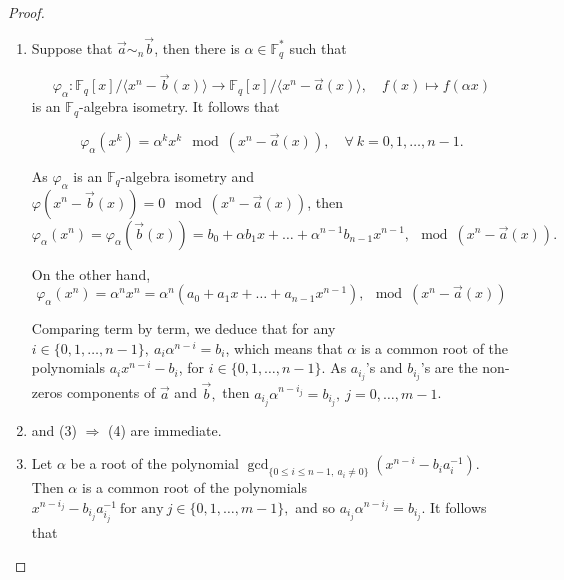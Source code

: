 \documentclass[12pt]{elsarticle}
\theoremstyle{break}
{\theorembodyfont{\upshape}
    \newtheorem{theorem}{Theorem}[section] %
    \newtheorem{lemma}[theorem]{Lemma} %
    \newtheorem{proposition}[theorem]{Proposition}
    \newtheorem{corollary}[theorem]{Corollary}
    \newtheorem{definition}[theorem]{Definition}
    \newtheorem{example}[theorem]{Example}
    \newtheorem{remark}[theorem]{Remark}
    \newtheorem{conjecture}[theorem]{Conjecture}
    \newtheorem*{proof}{{Proof}}
	\newtheorem*{notation}{Notation}
	\newtheorem*{main}{Cain Theorem}
	\newtheorem*{problem}{Problem}
}
\begin{document}
\begin{proof}
\begin{enumerate}
    \item [(1) $\Rightarrow$ (2)] 
    Suppose that $ \vec{a} \sim_{n} \vec{b} $, then there is $\alpha \in \mathbb{F}_q^*$ such that

$$\varphi_{\alpha} : \mathbb{F}_q[x] /\langle x^n - \vec{b}(x) \rangle \to \mathbb{F}_q[x] /\langle x^n - \vec{a}(x) \rangle, \quad f(x) \mapsto f(\alpha x) $$
is an $\mathbb{F}_q$-algebra isometry.  It follows that

$$ 
\varphi_{\alpha}(x^k) =  \alpha^k x^{k} \mod (x^n - \vec{a}(x)), \quad \forall  \ k = 0, 1, \ldots, n-1.
$$

As $\varphi_{\alpha}$ is an $\mathbb{F}_q$-algebra isometry and $ \varphi(x^n - \vec{b}(x)) = 0 \mod (x^n - \vec{a}(x))$, then
\begin{equation}
\varphi_{\alpha}(x^n) = \varphi_{\alpha}(\vec{b}(x)) = b_0 + \alpha b_1 x + \ldots + \alpha^{n-1}b_{n-1} x^{n-1}, \mod (x^n - \vec{a}(x)).
\end{equation}

On the other hand,
\begin{equation}
\varphi_{\alpha}(x^n) = \alpha^n x^n = \alpha^n ( a_0 + a_1 x + \ldots + a_{n-1} x^{n-1}), \mod (x^n - \vec{a}(x))
\end{equation}

Comparing term by term, we deduce that for any $ i \in \{0, 1, \ldots, n-1\}, \ a_i \alpha^{n-i} = b_i$, which means that $\alpha$ is a common root of the polynomials $ a_i x^{n-i} - b_i $, for $ i \in \{0, 1, \ldots, n-1\}$. As  $ a_{i_j}$'s and $  b_{i_j}$'s are the non-zeros components of $\vec{a}$ and $\vec{b},$   then $ a_{i_j} \alpha^{n-{i_j}} = b_{i_j},\ j=0,\ldots,m-1$.

\item[(2) $\Rightarrow$ (3)] and  (3) $\Rightarrow$ (4) are immediate. 

 \item [(4) $\Rightarrow$ (5)]
    Let $\alpha $ be a root of the polynomial   $\gcd_{\{0 \leq i \leq n-1, \ a_i \neq 0\}}( x^{n-i} - b_i a_i^{-1}) $. Then $\alpha$ is a common root of the polynomials $  x^{n-i_j} - b_{i_j} a_{i_j}^{-1} \  \text{for any} \ j\in \{ 0,1,\ldots, m-1\},$ and so   $a_{i_j} \alpha^{n-i_j}= b_{i_j}$.
    It follows that 


\end{enumerate}
\end{proof}
\end{document}
